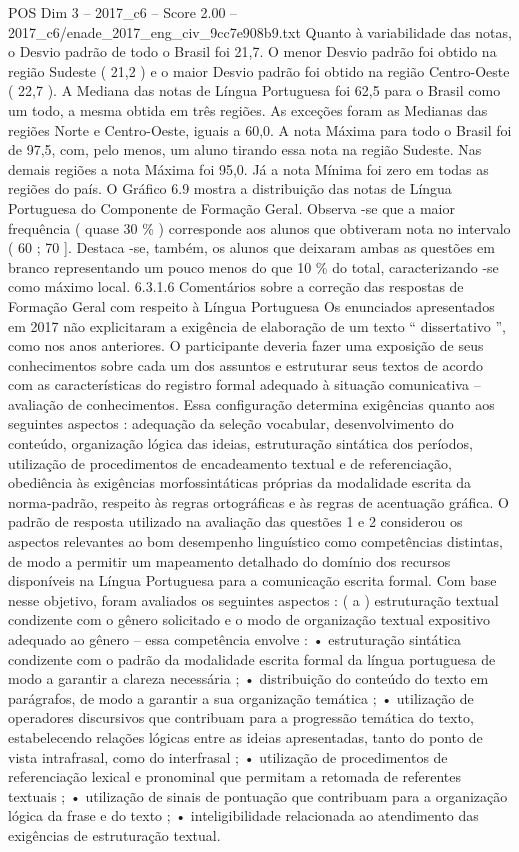\begin{textsample}{POS Dim 3 – 2017\_c6 – Score 2.00 – 2017\_c6/enade\_2017\_eng\_civ\_9cc7e908b9.txt}
Quanto à variabilidade das notas, o Desvio padrão de todo o Brasil foi 21,7.
O menor Desvio padrão foi obtido na região Sudeste ( 21,2 ) e o maior Desvio padrão foi obtido na região Centro-Oeste ( 22,7 ).
A Mediana das notas de Língua Portuguesa foi 62,5 para o Brasil como um todo, a mesma obtida em três regiões.
As exceções foram as Medianas das regiões Norte e Centro-Oeste, iguais a 60,0.
A nota Máxima para todo o Brasil foi de 97,5, com, pelo menos, um aluno tirando essa nota na região Sudeste.
Nas demais regiões a nota Máxima foi 95,0.
Já a nota Mínima foi zero em todas as regiões do país.
O Gráfico 6.9 mostra a distribuição das notas de Língua Portuguesa do Componente de Formação Geral.
Observa -se que a maior frequência ( quase 30 \% ) corresponde aos alunos que obtiveram nota no intervalo ( 60 ; 70 ].
Destaca -se, também, os alunos que deixaram ambas as questões em branco representando um pouco menos do que 10 \% do total, caracterizando -se como máximo local. 6.3.1.6 Comentários sobre a correção das respostas de Formação Geral com respeito à Língua Portuguesa Os enunciados apresentados em 2017 não explicitaram a exigência de elaboração de um texto “ dissertativo ”, como nos anos anteriores.
O participante deveria fazer uma exposição de seus conhecimentos sobre cada um dos assuntos e estruturar seus textos de acordo com as características do registro formal adequado à situação comunicativa – avaliação de conhecimentos.
Essa configuração determina exigências quanto aos seguintes aspectos : adequação da seleção vocabular, desenvolvimento do conteúdo, organização lógica das ideias, estruturação sintática dos períodos, utilização de procedimentos de encadeamento textual e de referenciação, obediência às exigências morfossintáticas próprias da modalidade escrita da norma-padrão, respeito às regras ortográficas e às regras de acentuação gráfica.
O padrão de resposta utilizado na avaliação das questões 1 e 2 considerou os aspectos relevantes ao bom desempenho linguístico como competências distintas, de modo a permitir um mapeamento detalhado do domínio dos recursos disponíveis na Língua Portuguesa para a comunicação escrita formal.
Com base nesse objetivo, foram avaliados os seguintes aspectos : ( a ) estruturação textual condizente com o gênero solicitado e o modo de organização textual expositivo adequado ao gênero – essa competência envolve : • estruturação sintática condizente com o padrão da modalidade escrita formal da língua portuguesa de modo a garantir a clareza necessária ; • distribuição do conteúdo do texto em parágrafos, de modo a garantir a sua organização temática ; • utilização de operadores discursivos que contribuam para a progressão temática do texto, estabelecendo relações lógicas entre as ideias apresentadas, tanto do ponto de vista intrafrasal, como do interfrasal ; • utilização de procedimentos de referenciação lexical e pronominal que permitam a retomada de referentes textuais ; • utilização de sinais de pontuação que contribuam para a organização lógica da frase e do texto ; • inteligibilidade relacionada ao atendimento das exigências de estruturação textual.

\end{textsample}
